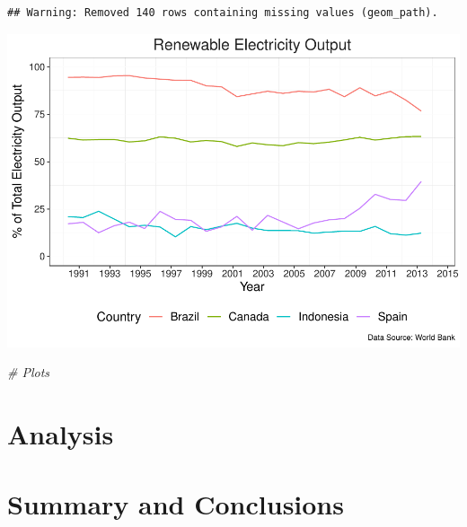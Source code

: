 \documentclass[12pt,]{article}
\newenvironment{Shaded}{\begin{snugshade}}{\end{snugshade}}
\newcommand{\CommentTok}[1]{\textcolor[rgb]{0.56,0.35,0.01}{\textit{#1}}}
\begin{document}
\begin{verbatim}
## Warning: Removed 140 rows containing missing values (geom_path).
\end{verbatim}

\includegraphics{Marx_ENV872_Project_files/figure-latex/unnamed-chunk-8-2.pdf}

\begin{Shaded}
\begin{Highlighting}[]
\CommentTok{# Plots}
\end{Highlighting}
\end{Shaded}

\newpage

\section{Analysis}\label{analysis}

\newpage

\section{Summary and Conclusions}\label{summary-and-conclusions}
\end{document}
